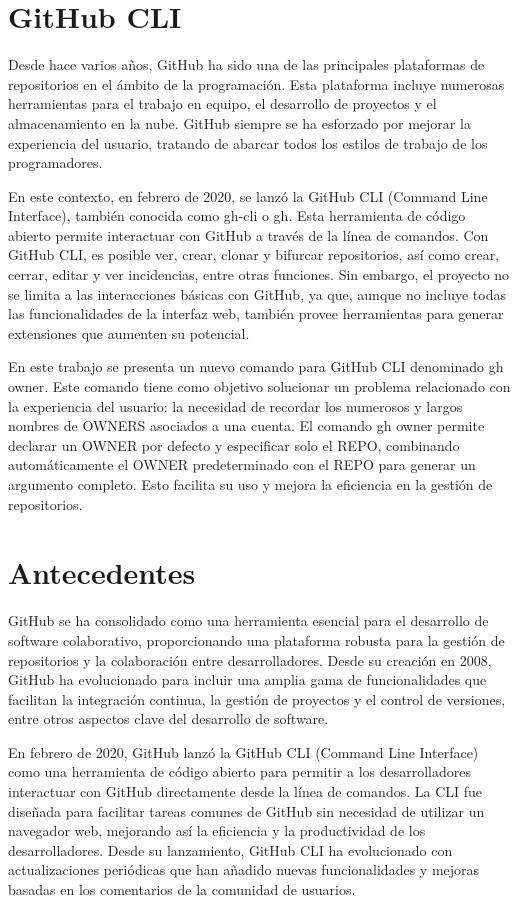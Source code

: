 \section{GitHub CLI}
Desde hace varios años, GitHub ha sido una de las principales plataformas de repositorios en el ámbito de la programación. Esta plataforma incluye numerosas herramientas para el trabajo en equipo, el desarrollo de proyectos y el almacenamiento en la nube. GitHub siempre se ha esforzado por mejorar la experiencia del usuario, tratando de abarcar todos los estilos de trabajo de los programadores.

En este contexto, en febrero de 2020, se lanzó la GitHub CLI (Command Line Interface), también conocida como gh-cli o gh. Esta herramienta de código abierto permite interactuar con GitHub a través de la línea de comandos. Con GitHub CLI, es posible ver, crear, clonar y bifurcar repositorios, así como crear, cerrar, editar y ver incidencias, entre otras funciones. Sin embargo, el proyecto no se limita a las interacciones básicas con GitHub, ya que, aunque no incluye todas las funcionalidades de la interfaz web, también provee herramientas para generar extensiones que aumenten su potencial.

En este trabajo se presenta un nuevo comando para GitHub CLI denominado gh owner. Este comando tiene como objetivo solucionar un problema relacionado con la experiencia del usuario: la necesidad de recordar los numerosos y largos nombres de OWNERS asociados a una cuenta. El comando gh owner permite declarar un OWNER por defecto y especificar solo el REPO, combinando automáticamente el OWNER predeterminado con el REPO para generar un argumento completo. Esto facilita su uso y mejora la eficiencia en la gestión de repositorios.

\section{Antecedentes}
GitHub se ha consolidado como una herramienta esencial para el desarrollo de software colaborativo, proporcionando una plataforma robusta para la gestión de repositorios y la colaboración entre desarrolladores. Desde su creación en 2008, GitHub ha evolucionado para incluir una amplia gama de funcionalidades que facilitan la integración continua, la gestión de proyectos y el control de versiones, entre otros aspectos clave del desarrollo de software.

En febrero de 2020, GitHub lanzó la GitHub CLI (Command Line Interface) como una herramienta de código abierto para permitir a los desarrolladores interactuar con GitHub directamente desde la línea de comandos. La CLI fue diseñada para facilitar tareas comunes de GitHub sin necesidad de utilizar un navegador web, mejorando así la eficiencia y la productividad de los desarrolladores. Desde su lanzamiento, GitHub CLI ha evolucionado con actualizaciones periódicas que han añadido nuevas funcionalidades y mejoras basadas en los comentarios de la comunidad de usuarios.

